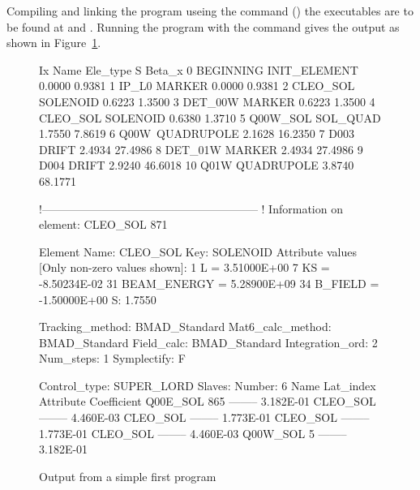 Compiling and linking the program useing the  command
() the executables are to be found at
 and . 
Running the program with the command 
gives the output as shown in Figure~\ref{f:output}.

\begin{figure}
\begin{listing}{1}
  Ix  Name              Ele_type                   S      Beta_x
   0  BEGINNING         INIT_ELEMENT          0.0000      0.9381
   1  IP_L0             MARKER                0.0000      0.9381
   2  CLEO_SOL\3        SOLENOID              0.6223      1.3500
   3  DET_00W           MARKER                0.6223      1.3500
   4  CLEO_SOL\4        SOLENOID              0.6380      1.3710
   5  Q00W\CLEO_SOL     SOL_QUAD              1.7550      7.8619
   6  Q00W\             QUADRUPOLE            2.1628     16.2350
   7  D003              DRIFT                 2.4934     27.4986
   8  DET_01W           MARKER                2.4934     27.4986
   9  D004              DRIFT                 2.9240     46.6018
  10  Q01W              QUADRUPOLE            3.8740     68.1771

 !---------------------------------------------------------
 ! Information on element: CLEO_SOL 871

  Element Name: CLEO_SOL
  Key: SOLENOID
  Attribute values [Only non-zero values shown]:
      1   L                =  3.51000E+00
      7   KS               = -8.50234E-02
     31   BEAM_ENERGY      =  5.28900E+09
     34   B_FIELD          = -1.50000E+00
  S:       1.7550

  Tracking_method:  BMAD_Standard
  Mat6_calc_method: BMAD_Standard
  Field_calc:       BMAD_Standard
  Integration_ord:    2
  Num_steps:          1
  Symplectify:        F

  Control_type: SUPER_LORD
  Slaves: Number:   6
      Name             Lat_index  Attribute       Coefficient
      Q00E\CLEO_SOL          865  --------          3.182E-01
      CLEO_SOL  --------          4.460E-03
      CLEO_SOL  --------          1.773E-01
      CLEO_SOL  --------          1.773E-01
      CLEO_SOL  --------          4.460E-03
      Q00W\CLEO_SOL            5  --------          3.182E-01
\end{listing}
\caption{Output from a simple first program}
\label{f:output}
\end{figure}

